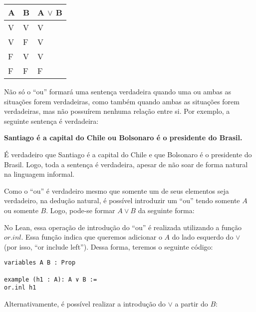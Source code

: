 \begin{table}[htb]
\centering
\begin{tabular}{|l|l|l|}
\hline
\textbf{A} & \textbf{B} & \textbf{A $\lor$ B} \\ \hline
V          & V          & V                 \\ \hline
V          & F          & V                 \\ \hline
F          & V          & V                 \\ \hline
F          & F          & F                 \\ \hline
\end{tabular}
\end{table}

Não só o ``ou'' formará uma sentença verdadeira quando uma ou ambas as situações forem verdadeiras, como também quando ambas as situações forem verdadeiras, mas não possuírem nenhuma relação entre si. Por exemplo, a seguinte sentença é verdadeira: 
\begin{center}
\textbf{Santiago é a capital do Chile ou Bolsonaro é o presidente do Brasil.}\\
\end{center}

É verdadeiro que Santiago é a capital do Chile e que Bolsonaro é o presidente do Brasil. Logo, toda a sentença é verdadeira, apesar de não soar de forma natural na linguagem informal.

Como o ``ou'' é verdadeiro mesmo que somente um de seus elementos seja verdadeiro, na dedução natural, é possível introduzir um ``ou'' tendo somente $A$ ou somente $B$. Logo, pode-se formar $A \lor B$ da seguinte forma:
\begin{prooftree}
\end{prooftree}

No Lean, essa operação de introdução do ``ou'' é realizada utilizando a função $or.inl$. Essa função indica que queremos adicionar o $A$ do lado esquerdo do $\lor$ (por isso, ``or include left''). Dessa forma, teremos o seguinte código: 
\begin{lstlisting} 
variables A B : Prop

example (h1 : A): A ∨ B :=
or.inl h1
\end{lstlisting} 

Alternativamente, é possível realizar a introdução do $\lor$ a partir do $B$:
\begin{prooftree}
\end{prooftree}

